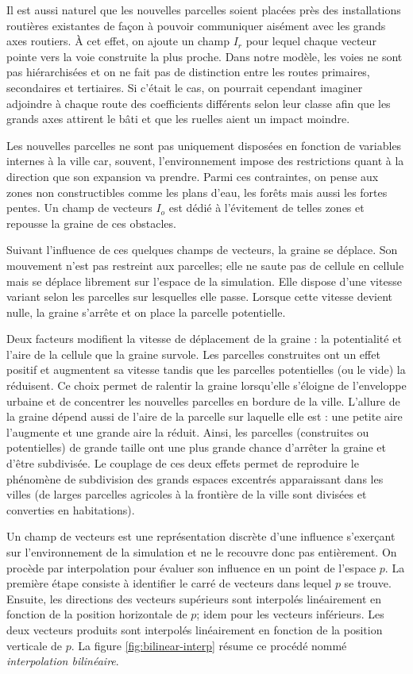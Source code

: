 \documentclass[10pt]{article}
\begin{document}
Il est aussi naturel que les nouvelles parcelles soient placées près
des installations routières existantes de façon à pouvoir communiquer
aisément avec les grands axes routiers. À cet effet, on ajoute un
champ $I_r$ pour lequel chaque vecteur pointe vers la voie construite
la plus proche. Dans notre modèle, les voies ne sont pas hiérarchisées
et on ne fait pas de distinction entre les routes primaires,
secondaires et tertiaires. Si c'était le cas, on pourrait cependant
imaginer adjoindre à chaque route des coefficients différents selon
leur classe afin que les grands axes attirent le bâti et que les
ruelles aient un impact moindre.

Les nouvelles parcelles ne sont pas uniquement disposées en fonction
de variables internes à la ville car, souvent, l'environnement impose
des restrictions quant à la direction que son expansion va
prendre. Parmi ces contraintes, on pense aux zones non constructibles
comme les plans d'eau, les forêts mais aussi les fortes pentes. Un
champ de vecteurs $I_o$ est dédié à l'évitement de telles zones et
repousse la graine de ces obstacles.

Suivant l'influence de ces quelques champs de vecteurs, la graine se
déplace. Son mouvement n'est pas restreint aux parcelles; elle ne
saute pas de cellule en cellule mais se déplace librement sur l'espace
de la simulation. Elle dispose d'une vitesse variant selon les
parcelles sur lesquelles elle passe. Lorsque cette vitesse devient
nulle, la graine s'arrête et on place la parcelle potentielle.

Deux facteurs modifient la vitesse de déplacement de la graine : la
potentialité et l'aire de la cellule que la graine survole. Les
parcelles construites ont un effet positif et augmentent sa vitesse
tandis que les parcelles potentielles (ou le vide) la réduisent. Ce
choix permet de ralentir la graine lorsqu'elle s'éloigne de
l'enveloppe urbaine et de concentrer les nouvelles parcelles en
bordure de la ville. L'allure de la graine dépend aussi de l'aire de
la parcelle sur laquelle elle est : une petite aire l'augmente et une
grande aire la réduit. Ainsi, les parcelles (construites ou
potentielles) de grande taille ont une plus grande chance d'arrêter la
graine et d'être subdivisée. Le couplage de ces deux effets permet de
reproduire le phénomène de subdivision des grands espaces excentrés
apparaissant dans les villes (de larges parcelles agricoles à la
frontière de la ville sont divisées et converties en habitations).

Un champ de vecteurs est une représentation discrète d'une influence
s'exerçant sur l'environnement de la simulation et ne le recouvre donc
pas entièrement. On procède par interpolation pour évaluer son
influence en un point de l'espace $p$. La première étape consiste à
identifier le carré de vecteurs dans lequel $p$ se trouve. Ensuite,
les directions des vecteurs supérieurs sont interpolés linéairement en
fonction de la position horizontale de $p$; idem pour les vecteurs
inférieurs. Les deux vecteurs produits sont interpolés linéairement en
fonction de la position verticale de $p$. La figure
\ref{fig:bilinear-interp} résume ce procédé nommé
\textit{interpolation bilinéaire}.
\end{document}
